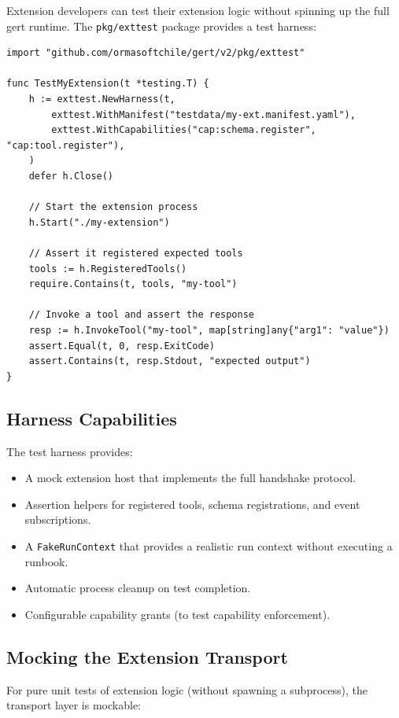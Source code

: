 Extension developers can test their extension logic without spinning up the full gert runtime. The \texttt{pkg/exttest} package provides a test harness:

\begin{verbatim}
import "github.com/ormasoftchile/gert/v2/pkg/exttest"

func TestMyExtension(t *testing.T) {
    h := exttest.NewHarness(t,
        exttest.WithManifest("testdata/my-ext.manifest.yaml"),
        exttest.WithCapabilities("cap:schema.register", "cap:tool.register"),
    )
    defer h.Close()

    // Start the extension process
    h.Start("./my-extension")

    // Assert it registered expected tools
    tools := h.RegisteredTools()
    require.Contains(t, tools, "my-tool")

    // Invoke a tool and assert the response
    resp := h.InvokeTool("my-tool", map[string]any{"arg1": "value"})
    assert.Equal(t, 0, resp.ExitCode)
    assert.Contains(t, resp.Stdout, "expected output")
}
\end{verbatim}

\subsection{Harness Capabilities}

The test harness provides:

\begin{itemize}
  \item A mock extension host that implements the full handshake protocol.
  \item Assertion helpers for registered tools, schema registrations, and event subscriptions.
  \item A \texttt{FakeRunContext} that provides a realistic run context without executing a runbook.
  \item Automatic process cleanup on test completion.
  \item Configurable capability grants (to test capability enforcement).
\end{itemize}

\subsection{Mocking the Extension Transport}

For pure unit tests of extension logic (without spawning a subprocess), the transport layer is mockable:

